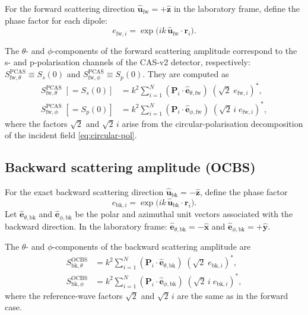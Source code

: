 \documentclass[11pt,a4paper]{article}
\begin{document}
For the forward scattering direction $\hat{\bm{u}}_{\text{fw}} = +\hat{\bm{z}}$
in the laboratory frame, define the phase factor for each dipole:
\begin{equation}
  e_{\text{fw},i}
    = \exp\!\bigl(ik\,\hat{\bm{u}}_{\text{fw}} \cdot \bm{r}_i\bigr).
  \label{eq:e-fw}
\end{equation}

The $\theta$- and $\phi$-components of the forward scattering amplitude
correspond to the s- and p-polarisation channels of the CAS-v2
detector, respectively:
$S_{\text{fw},\theta}^{\text{PCAS}} \equiv S_s(0)$ and
$S_{\text{fw},\phi}^{\text{PCAS}} \equiv S_p(0)$.
They are computed as
\begin{align}
  S_{\text{fw},\theta}^{\text{PCAS}}\; [= S_s(0)]
    &= k^2 \sum_{i=1}^{N}
       (\bm{P}_i \cdot \hat{\bm{e}}_{\theta,\text{fw}})\;
       (\sqrt{2}\; e_{\text{fw},i})^*,
  \label{eq:S-fw-theta} \\
  S_{\text{fw},\phi}^{\text{PCAS}}\; [= S_p(0)]
    &= k^2 \sum_{i=1}^{N}
       (\bm{P}_i \cdot \hat{\bm{e}}_{\phi,\text{fw}})\;
       (\sqrt{2}\,i\; e_{\text{fw},i})^*,
  \label{eq:S-fw-phi}
\end{align}
where the factors $\sqrt{2}$ and $\sqrt{2}\,i$ arise from the
circular-polarisation decomposition of the incident field
\eqref{eq:circular-pol}.

\subsection{Backward scattering amplitude (OCBS)}
\label{sec:S-bk}

For the exact backward scattering direction
$\hat{\bm{u}}_{\text{bk}} = -\hat{\bm{z}}$, define the phase factor
\begin{equation}
  e_{\text{bk},i}
    = \exp\!\bigl(ik\,\hat{\bm{u}}_{\text{bk}} \cdot \bm{r}_i\bigr).
  \label{eq:e-bk}
\end{equation}
Let $\hat{\bm{e}}_{\theta,\text{bk}}$ and
$\hat{\bm{e}}_{\phi,\text{bk}}$ be the polar and azimuthal unit
vectors associated with the backward direction.
In the laboratory frame:
$\hat{\bm{e}}_{\theta,\text{bk}} = -\hat{\bm{x}}$ and
$\hat{\bm{e}}_{\phi,\text{bk}} = +\hat{\bm{y}}$.

The $\theta$- and $\phi$-components of the backward scattering
amplitude are
\begin{align}
  S_{\text{bk},\theta}^{\text{OCBS}}
    &= k^2 \sum_{i=1}^{N}
       (\bm{P}_i \cdot \hat{\bm{e}}_{\theta,\text{bk}})\;
       (\sqrt{2}\; e_{\text{bk},i})^*,
  \label{eq:S-bk-theta} \\
  S_{\text{bk},\phi}^{\text{OCBS}}
    &= k^2 \sum_{i=1}^{N}
       (\bm{P}_i \cdot \hat{\bm{e}}_{\phi,\text{bk}})\;
       (\sqrt{2}\,i\; e_{\text{bk},i})^*,
  \label{eq:S-bk-phi}
\end{align}
where the reference-wave factors $\sqrt{2}$ and $\sqrt{2}\,i$ are the
same as in the forward case.
\end{document}
